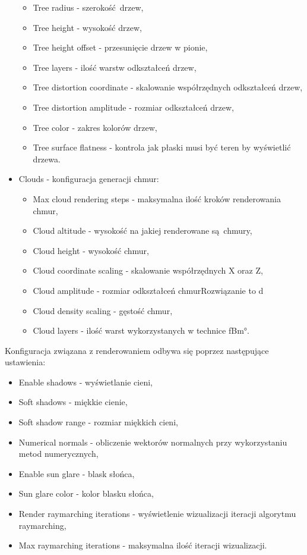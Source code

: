 \begin{itemize}
\begin{itemize}
    \item Tree radius - szerokość drzew,
    \item Tree height - wysokość drzew,
    \item Tree height offset - przesunięcie drzew w pionie,
    \item Tree layers - ilość warstw odkształceń drzew,
    \item Tree distortion coordinate - skalowanie współrzędnych odkształceń drzew,
    \item Tree distortion amplitude - rozmiar odkształceń drzew,
    \item Tree color - zakres kolorów drzew,
    \item Tree surface flatness - kontrola jak płaski musi być teren by wyświetlić drzewa.
  \end{itemize}
\item Clouds - konfiguracja generacji chmur:
  \begin{itemize}
    \item Max cloud rendering steps - maksymalna ilość kroków renderowania chmur,
    \item Cloud altitude - wysokość na jakiej renderowane są chmury,
    \item Cloud height - wysokość chmur,
    \item Cloud coordinate scaling - skalowanie współrzędnych X oraz Z,
    \item Cloud amplitude - rozmiar odkształceń chmurRozwiązanie to d
    \item Cloud density scaling - gęstość chmur,
    \item Cloud layers - ilość warst wykorzystanych w technice \ang{fBm}.
  \end{itemize}
\end{itemize}

Konfiguracja związana z renderowaniem odbywa się poprzez następujące ustawienia:
\begin{itemize}
\item Enable shadows - wyświetlanie cieni,
\item Soft shadows - miękkie cienie,
\item Soft shadow range - rozmiar miękkich cieni,
\item Numerical normals - obliczenie wektorów normalnych przy wykorzystaniu metod numerycznych,
\item Enable sun glare - blask słońca,
\item Sun glare color - kolor blasku słońca,
\item Render raymarching iterations - wyświetlenie wizualizacji iteracji algorytmu raymarching,
\item Max raymarching iterations - maksymalna ilość iteracji wizualizacji.
\end{itemize}

